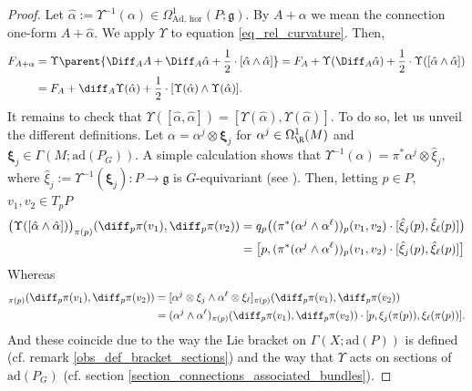 \begin{proof}
    Let \(\hat{\alpha}:=\Upsilon^{-1}(\alpha)\in \Omega_{\text{Ad, hor}}^1(P; \mathfrak{g})\). By \(A+\alpha\) we mean the connection one-form \(A+\hat{\alpha}\). We apply \(\Upsilon\) to equation \eqref{eq_rel_curvature}. Then,
    \begin{align*}
        F_{A+\alpha} & = \Upsilon\parent{\Diff_AA + \Diff_A \hat{\alpha} + \frac{1}{2}\cdot [\hat{\alpha} \wedge \hat{\alpha}]} = F_A+ \Upsilon(\Diff_A \hat{\alpha})+ \frac{1}{2}\cdot \Upsilon([\hat{\alpha} \wedge  \hat{\alpha}]) \\
        &= F_A + \diff_A \Upsilon(\hat{\alpha}) + \frac{1}{2}\cdot [\Upsilon(\hat{\alpha}) \wedge \Upsilon(\hat{\alpha})].
    \end{align*}
    It remains to check that \(\Upsilon([\hat{\alpha}, \hat{\alpha}])=[\Upsilon(\hat{\alpha}), \Upsilon(\hat{\alpha})]\). To do so, let us unveil the different definitions. Let \(\alpha=\alpha^j \otimes \bm{\xi}_j\) for \(\alpha^j \in \Omega_\R^1(M)\) and \(\bm{\xi}_j \in \Gamma(M; \mathrm{ad}(P_G))\). A simple calculation shows that \(\Upsilon^{-1}(\alpha)=\pi^* \alpha^j \otimes \hat{\xi}_j\), where \(\hat{\xi}_j:=\Upsilon^{-1}(\bm{\xi}_j)\colon P \to \mathfrak{g}\) is \(G\)-equivariant (see \parencite[Remark 1.2.13]{Rudolph_2017pug}). Then, letting \(p \in P\), \(v_1, v_2 \in T_pP\)
    \begin{align*}
        \big(\Upsilon([\hat{\alpha}\wedge \hat{\alpha}])\big)_{\pi(p)}(\diff_p\pi(v_1), \diff_p\pi(v_2)) & = q_p \big((\pi^*(\alpha^j \wedge \alpha ^\ell))_{p}(v_1, v_2) \cdot [\hat{\xi}_j(p), \hat{\xi}_\ell(p)]\big) \\
        &=\big[p,(\pi^*(\alpha^j \wedge \alpha ^\ell))_{p}(v_1, v_2) \cdot [\hat{\xi}_j(p), \hat{\xi}_\ell(p)]  \big]
    \end{align*}
    Whereas
    \begin{align*}
        [\Upsilon(\hat{\alpha}) \wedge \Upsilon(\hat{\alpha})]_{\pi(p)}(\diff_p\pi(v_1), \diff_p\pi(v_2)) &= [\alpha^j \otimes \xi_j \wedge \alpha^\ell \otimes \xi_\ell]_{\pi(p)}(\diff_p\pi(v_1), \diff_p\pi(v_2)) \\
        & = (\alpha^j \wedge \alpha^\ell)_{\pi(p)}(\diff_p\pi(v_1), \diff_p\pi(v_2))\cdot [p, \xi_j(\pi(p)), \xi_{\ell}(\pi(p))].
    \end{align*}
    And these coincide due to the way the Lie bracket on \(\Gamma(X; \mathrm{ad}(P))\) is defined (cf. remark \ref{obs_def_bracket_sections}) and the way that \(\Upsilon\) acts on sections of \(\mathrm{ad}(P_G)\) (cf. section \ref{section_connections_associated_bundles}).
\end{proof}


